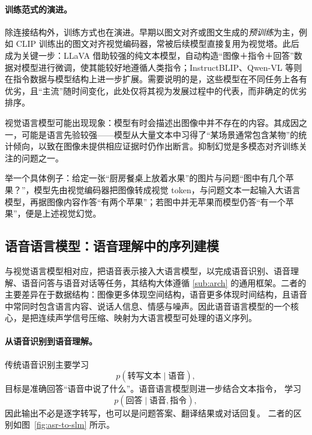 \paragraph{训练范式的演进。}除连接结构外，训练方式也在演进。早期以图文对齐或图文生成的\emph{预训练}为主，例如 CLIP\cite{clip} 训练出的图文对齐视觉编码器，常被后续模型直接复用为视觉塔。此后成为关键一步：LLaVA 借助较强的纯文本模型，自动构造“图像＋指令＋回答”数据对模型进行微调，使其能较好地遵循人类指令；InstructBLIP\cite{instructblip}、Qwen-VL\cite{qwenvl} 等则在指令数据与模型结构上进一步扩展。需要说明的是，这些模型在不同任务上各有优劣，且“主流”随时间变化，此处仅将其视为发展过程中的代表，而非确定的优劣排序。

\begin{importantnote}
  视觉语言模型可能出现现象：模型有时会描述出图像中并不存在的内容。其成因之一，可能是语言先验较强——模型从大量文本中习得了“某场景通常包含某物”的统计倾向，以致在图像未提供相应证据时仍作出断言。抑制幻觉是多模态对齐训练关注的问题之一。
\end{importantnote}

举一个具体例子：给定一张“厨房餐桌上放着水果”的图片与问题“图中有几个苹果？”，模型先由视觉编码器把图像转成视觉 token，与问题文本一起输入大语言模型，再据图像内容作答“有两个苹果”；若图中并无苹果而模型仍答“有一个苹果”，便是上述视觉幻觉。

\subsection{语音语言模型：语音理解中的序列建模}
\label{sub:slm}

与视觉语言模型相对应，把语音表示接入大语言模型，以完成语音识别、语音理解、语音问答与语音对话等任务，其结构大体遵循 \ref{sub:arch} 的通用框架。二者的主要差异在于数据结构：图像更多体现空间结构，语音更多体现时间结构，且语音中常同时包含语言内容、说话人信息、情感与噪声。因此语音语言模型的一个核心，是把连续声学信号压缩、映射为大语言模型可处理的语义序列。

\paragraph{从语音识别到语音理解。}
传统语音识别主要学习
\[
p(\text{转写文本}\mid\text{语音}),
\]
目标是准确回答“语音中说了什么”。语音语言模型则进一步结合文本指令，
学习
\[
p(\text{回答}\mid\text{语音},\text{指令}),
\]
因此输出不必是逐字转写，也可以是问题答案、翻译结果或对话回复。
二者的区别如图~\ref{fig:asr-to-slm} 所示。

